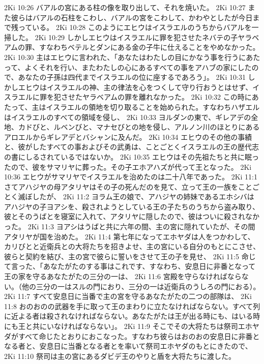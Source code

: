 2Ki 10:26  バアルの宮にある柱の像を取り出して、それを焼いた。
2Ki 10:27  また彼らはバアルの石柱をこわし、バアルの宮をこわして、かわやとしたが今日まで残っている。
2Ki 10:28  このようにエヒウはイスラエルのうちからバアルを一掃した。
2Ki 10:29  しかしエヒウはイスラエルに罪を犯させたネバテの子ヤラベアムの罪、すなわちベテルとダンにある金の子牛に仕えることをやめなかった。
2Ki 10:30  主はエヒウに言われた、「あなたはわたしの目にかなう事を行うにあたって、よくそれを行い、またわたしの心にあるすべての事をアハブの家にしたので、あなたの子孫は四代までイスラエルの位に座するであろう」。
2Ki 10:31  しかしエヒウはイスラエルの神、主の律法を心をつくして守り行おうとはせず、イスラエルに罪を犯させたヤラベアムの罪を離れなかった。
2Ki 10:32  この時にあたって、主はイスラエルの領地を切り取ることを始められた。すなわちハザエルはイスラエルのすべての領域を侵し、
2Ki 10:33  ヨルダンの東で、ギレアデの全地、カドびと、ルベンびと、マナセびとの地を侵し、アルノン川のほとりにあるアロエルからギレアデとバシャンに及んだ。
2Ki 10:34  エヒウのその他の事績と、彼がしたすべての事およびその武勇は、ことごとくイスラエルの王の歴代志の書にしるされているではないか。
2Ki 10:35  エヒウはその先祖たちと共に眠ったので、彼をサマリヤに葬った。その子エホアハズが代って王となった。
2Ki 10:36  エヒウがサマリヤでイスラエルを治めたのは二十八年であった。
2Ki 11:1  さてアハジヤの母アタリヤはその子の死んだのを見て、立って王の一族をことごとく滅ぼしたが、
2Ki 11:2  ヨラム王の娘で、アハジヤの姉妹であるエホシバはアハジヤの子ヨアシを、殺されようとしている王の子たちのうちから盗み取り、彼とそのうばとを寝室に入れて、アタリヤに隠したので、彼はついに殺されなかった。
2Ki 11:3  ヨアシはうばと共に六年の間、主の宮に隠れていたが、その間アタリヤが国を治めた。
2Ki 11:4  第七年になってエホヤダは人をつかわして、カリびとと近衛兵との大将たちを招きよせ、主の宮にいる自分のもとにこさせ、彼らと契約を結び、主の宮で彼らに誓いをさせて王の子を見せ、
2Ki 11:5  命じて言った、「あなたがたのする事はこれです、すなわち、安息日に非番となって王の家を守るあなたがたの三分の一は、
2Ki 11:6  宮殿を守らなければならない。（他の三分の一はスルの門におり、三分の一は近衛兵のうしろの門におる）。
2Ki 11:7  すべて安息日に当番で主の宮を守るあなたがたの二つの部隊は、
2Ki 11:8  おのおのの武器を手に取って王のまわりに立たなければならない。すべて列に近よる者は殺されなければならない。あなたがたは王が出る時にも、はいる時にも王と共にいなければならない」。
2Ki 11:9  そこでその大将たちは祭司エホヤダがすべて命じたとおりにおこなった。すなわち彼らはおのおの安息日に非番となる者と、安息日に当番となる者とを率いて祭司エホヤダのもとにきたので、
2Ki 11:10  祭司は主の宮にあるダビデ王のやりと盾を大将たちに渡した。

